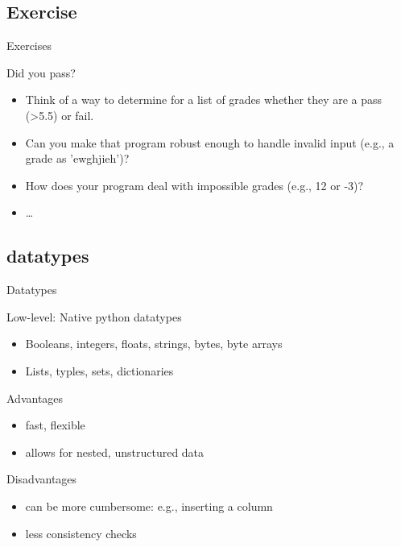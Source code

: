 \documentclass[compress]{beamer}
\begin{document}
\subsection{Exercise}
\begin{frame}{Exercises}
\begin{block}{Did you pass?}
	\begin{itemize}
		\item Think of a way to determine for a list of  grades whether they are a pass (>5.5) or fail.
		\item Can you make that program robust enough to handle invalid input (e.g., a grade as 'ewghjieh')?
		\item How does your program deal with impossible grades (e.g., 12 or -3)?
		\item \ldots
	\end{itemize}
\end{block}
\end{frame}

\subsection{datatypes}
\begin{frame}{Datatypes}
\begin{block}{Low-level: Native python datatypes}
	\begin{itemize}[<+->]
		\item Booleans, integers, floats, strings, bytes, byte arrays
		\item Lists, typles, sets, dictionaries
	\end{itemize}
\end{block}
\pause
\begin{exampleblock}{Advantages }
	\begin{itemize}[<+->]
		\item fast, flexible
		\item allows for nested, unstructured data 
	\end{itemize}
\end{exampleblock}
\pause
\begin{alertblock}{Disadvantages }
	\begin{itemize}[<+->]
		\item can be more cumbersome: e.g., inserting a column
		\item less consistency checks
	\end{itemize}
\end{alertblock}
\end{frame}
\end{document}

